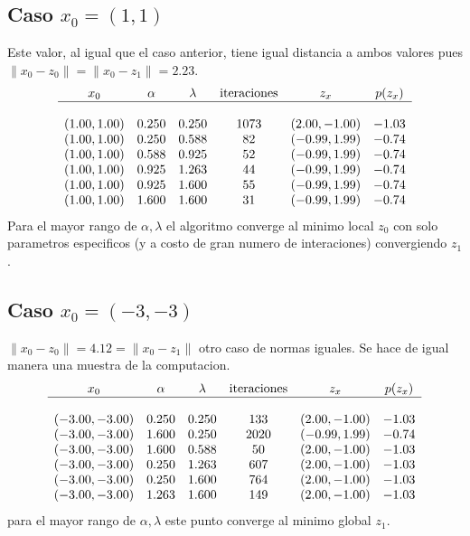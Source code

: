 \documentclass[letterpaper]{article}
\begin{document}
\subsection*{Caso \(x_0 = (1,1)\)}
Este valor, al igual que el caso anterior, tiene igual distancia a ambos
valores pues \(\lVert x_0 - z_0 \rVert = \lVert x_0 - z_1 \rVert = 2.23 \).
\[
\begin{array}{c c c c c c}
  x_0 & \alpha & \lambda & \text{iteraciones} & z_x & p(z_{x}) \\
  \hline \\
  (1.00, 1.00) & 0.250 & 0.250 & 1073 & (2.00, -1.00) & -1.03 \\
  (1.00, 1.00) & 0.250 & 0.588 & 82 & (-0.99, 1.99) & -0.74 \\
  (1.00, 1.00) & 0.588 & 0.925 & 52 & (-0.99, 1.99) & -0.74 \\
  (1.00, 1.00) & 0.925 & 1.263 & 44 & (-0.99, 1.99) & -0.74 \\
  (1.00, 1.00) & 0.925 & 1.600 & 55 & (-0.99, 1.99) & -0.74 \\
  (1.00, 1.00) & 1.600 & 1.600 & 31 & (-0.99, 1.99) & -0.74 \\
\end{array}
\]
Para el mayor rango de \(\alpha,\lambda\) el algoritmo converge al minimo
local \(z_0\) con solo parametros especificos (y a costo de gran numero
de interaciones) convergiendo \(z_1\).

\subsection*{Caso \(x_0 = (-3, -3)\)}
\(\lVert x_0 - z_0 \rVert = 4.12 =  \lVert  x_0 - z_1 \rVert \) otro caso
de normas iguales. Se hace de igual manera una muestra de la computacion.
\[
\begin{array}{c c c c c c}
  x_0 & \alpha & \lambda & \text{iteraciones} & z_x & p(z_{x}) \\
  \hline \\
  (-3.00, -3.00) & 0.250 & 0.250 & 133  & (2.00, -1.00) & -1.03 \\
  (-3.00, -3.00) & 1.600 & 0.250 & 2020 & (-0.99, 1.99) & -0.74 \\
  (-3.00, -3.00) & 1.600 & 0.588 & 50   & (2.00, -1.00) & -1.03 \\
  (-3.00, -3.00) & 0.250 & 1.263 & 607  & (2.00, -1.00) & -1.03 \\
  (-3.00, -3.00) & 0.250 & 1.600 & 764  & (2.00, -1.00) & -1.03 \\
  (-3.00, -3.00) & 1.263 & 1.600 & 149  & (2.00, -1.00) & -1.03 \\
\end{array}
\]
para el mayor rango de \(\alpha,\lambda\) este punto converge al minimo
global \(z_1\).
\end{document}
